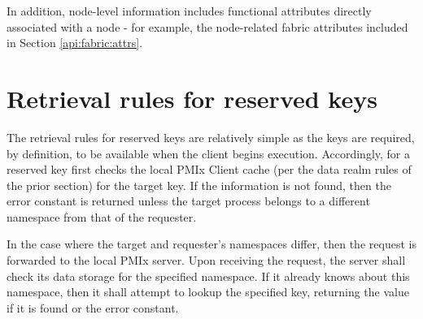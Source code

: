 \vspace{\baselineskip}

In addition, node-level information includes functional attributes directly associated with a node - for example, the node-related fabric attributes included in Section \ref{api:fabric:attrs}.

\section{Retrieval rules for reserved keys}
\label{chap:api_rsvd_keys:retrules}

The retrieval rules for reserved keys are relatively simple as the keys are
required, by definition, to be available when the client begins execution.
Accordingly,  for a reserved key first checks the local
\ac{PMIx} Client cache (per the data realm rules of the prior section) for the target key. If the information is not found,
then the  error constant is returned unless the
target process belongs to a different namespace from that of the requester.

In the case where the target and requester's namespaces differ, then the
request is forwarded to the local \ac{PMIx} server. Upon receiving the
request, the server shall check its data storage for the specified namespace.
If it already knows about this namespace, then it shall attempt to lookup the
specified key, returning the value if it is found or the
 error constant.

